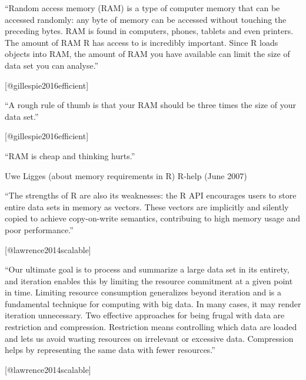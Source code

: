 \documentclass[]{tufte-book}
\begin{document}
\begin{marginfigure}
``Random access memory (RAM) is a type of computer memory that can be
accessed randomly: any byte of memory can be accessed without touching
the preceding bytes. RAM is found in computers, phones, tablets and even
printers. The amount of RAM R has access to is incredibly important.
Since R loads objects into RAM, the amount of RAM you have available can
limit the size of data set you can analyse.''

{[}@gillespie2016efficient{]}
\end{marginfigure}

\begin{marginfigure}
``A rough rule of thumb is that your RAM should be three times the size
of your data set.''

{[}@gillespie2016efficient{]}
\end{marginfigure}

\begin{marginfigure}
``RAM is cheap and thinking hurts.''

Uwe Ligges (about memory requirements in R) R-help (June 2007)
\end{marginfigure}

\begin{marginfigure}
``The strengths of R are also its weaknesses: the R API encourages users
to store entire data sets in memory as vectors. These vectors are
implicitly and silently copied to achieve copy-on-write semantics,
contribuing to high memory usage and poor performance.''

{[}@lawrence2014scalable{]}
\end{marginfigure}

\begin{marginfigure}
``Our ultimate goal is to process and summarize a large data set in its
entirety, and iteration enables this by limiting the resource commitment
at a given point in time. Limiting resource consumption generalizes
beyond iteration and is a fundamental technique for computing with big
data. In many cases, it may render iteration unnecessary. Two effective
approaches for being frugal with data are restriction and compression.
Restriction means controlling which data are loaded and lets us avoid
wasting resources on irrelevant or excessive data. Compression helps by
representing the same data with fewer resources.''

{[}@lawrence2014scalable{]}
\end{marginfigure}
\end{document}
